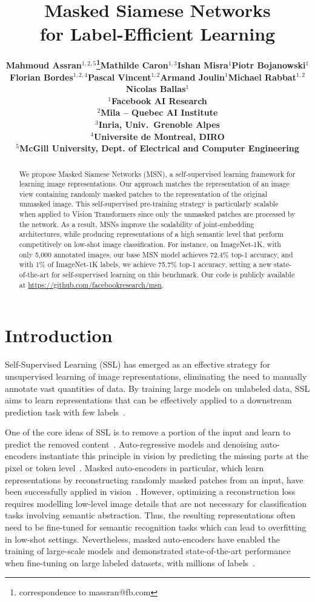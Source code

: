 \documentclass{article}
\title{Masked Siamese Networks\\ for Label-Efficient Learning}
\author{\bf Mahmoud Assran$^{1,2,5}$\thanks{correspondence to massran@fb.com}\quad Mathilde Caron$^{1,3}$\quad Ishan Misra$^{1}$\quad Piotr Bojanowski$^{1}$ \\ 
\bf Florian Bordes$^{1,2,4}$\quad Pascal Vincent$^{1,2}$\quad Armand Joulin$^{1}$\quad Michael Rabbat$^{1,2}$\quad
\bf Nicolas Ballas$^{1}$\\[2mm]
$^{1}$Facebook AI Research\\
$^{2}$Mila -- Quebec AI Institute \\
$^{3}$Inria, Univ.~Grenoble Alpes \\
$^{4}$Universite de Montreal, DIRO \\
$^{5}$McGill University, Dept. of Electrical and Computer Engineering
}
\begin{document}
\maketitle

\begin{abstract}
We propose Masked Siamese Networks (MSN), a self-supervised learning framework for learning image representations.
Our approach matches the representation of an image view containing randomly masked patches to the representation of the original unmasked image.
This self-supervised pre-training strategy is particularly scalable when applied to Vision Transformers since only the unmasked patches are processed by the network.
As a result, MSNs improve the scalability of joint-embedding architectures, while producing representations of a high semantic level that perform competitively on low-shot image classification.
For instance, on ImageNet-1K, with only 5,000 annotated images, our base MSN model achieves 72.4\% top-1 accuracy, and with 1\% of ImageNet-1K labels, we achieve 75.7\% top-1 accuracy, setting a new state-of-the-art for self-supervised learning on this benchmark. Our code is publicly available at \href{https://github.com/facebookresearch/msn}{https://github.com/facebookresearch/msn}.
\end{abstract}

\section{Introduction}
Self-Supervised Learning (SSL) has emerged as an effective strategy for unsupervised learning of image representations, eliminating the need to manually annotate vast quantities of data.
By training large models on unlabeled data, SSL aims to learn representations that can be effectively applied to a downstream prediction task with few labels~\citep{chen2020exploring}.

One of the core ideas of SSL is to remove a portion of the input and learn to predict the removed content~\citep{pathak2016context}.
Auto-regressive models and denoising auto-encoders instantiate this principle in vision by predicting the missing parts at the pixel or token level~\citep{chen2020generative,vincent2010stacked,he2021masked,bao2021beit,baevski2022data2vec}.
Masked auto-encoders in particular, which learn representations by reconstructing randomly masked patches from an input, have been successfully applied in vision~\citep{he2021masked,xie2021simmim,wei2021masked,bao2021beit}.
However, optimizing a reconstruction loss requires modelling low-level image details that are not necessary for classification tasks involving semantic abstraction. 
Thus, the resulting representations often need to be fine-tuned for semantic recognition tasks which can lead to overfitting in low-shot settings.
Nevertheless, masked auto-encoders have enabled the training of large-scale models and demonstrated state-of-the-art performance when fine-tuning on large labeled datasets, with millions of labels~\citep{bao2021beit,he2021masked,xie2021simmim,baevski2022data2vec}.
\end{document}
